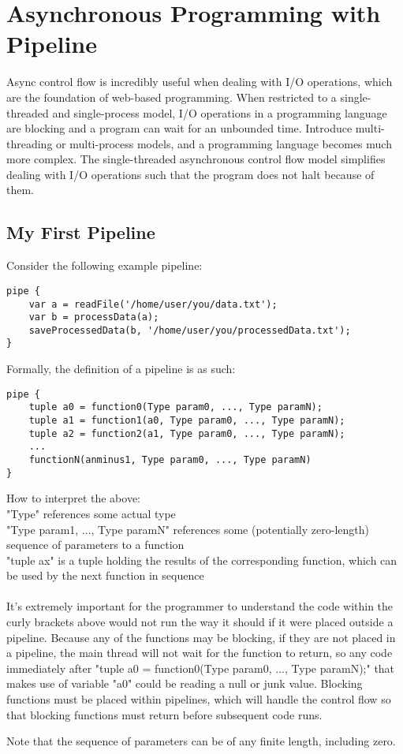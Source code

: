 \documentclass[./LRM_main.tex]{subfiles}
\begin{document}


\chapter{Asynchronous Programming with Pipeline}
Async control flow is incredibly useful when dealing with I/O operations, which are the foundation of web-based programming. When restricted to a single-threaded and single-process model, I/O operations in a programming language are blocking and a program can wait for an unbounded time. Introduce multi-threading or multi-process models, and a programming language becomes much more complex. The single-threaded asynchronous control flow model simplifies dealing with I/O operations such that the program does not halt because of them.


\section{My First Pipeline}
Consider the following example pipeline:

\begin{lstlisting}
pipe {
	var a = readFile('/home/user/you/data.txt'); 
 	var b = processData(a); 
	saveProcessedData(b, '/home/user/you/processedData.txt');
}
\end{lstlisting}
Formally, the definition of a pipeline is as such:
\begin{lstlisting}
pipe {
	tuple a0 = function0(Type param0, ..., Type paramN); 
	tuple a1 = function1(a0, Type param0, ..., Type paramN); 
	tuple a2 = function2(a1, Type param0, ..., Type paramN);
	... 
	functionN(anminus1, Type param0, ..., Type paramN)
}
\end{lstlisting}
How to interpret the above:\\
"Type" references some actual type\\
"Type param1, ..., Type paramN" references some (potentially zero-length) sequence of parameters to a function\\
"tuple ax" is a tuple holding the results of the corresponding function, which can be used by the next function in sequence\\\\

It's extremely important for the programmer to understand the code within the curly brackets above would not run the way it should if it were placed outside a pipeline. Because any of the functions may be blocking, if they are not placed in a pipeline, the main thread will not wait for the function to return, so any code immediately after "tuple a0 = function0(Type param0, ..., Type paramN);" that makes use of variable "a0" could be reading a null or junk value. Blocking functions must be placed within pipelines, which will handle the control flow so that blocking functions must return before subsequent code runs.
\begin{adjustwidth}{1cm}{2cm}
Note that the sequence of parameters can be of any finite length, including zero.
\end{adjustwidth}
\end{document}
